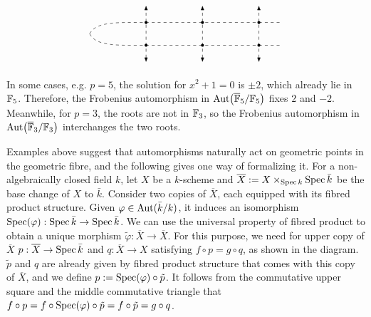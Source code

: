 \begin{example}
\[\begin{tikzpicture}[>=Latex, scale=1]
            \draw[dashed, <->] (2,0.4) -- (2,2.4);
            \fill (2,1.8) circle (1.5pt);
            \fill (2,1.0) circle (1.5pt);
        
            \draw[dashed, <->] (4,0.4) -- (4,2.4);
            \fill (4,1.8) circle (1.5pt);
            \fill (4,1.0) circle (1.5pt);
        
            \draw[dashed, <->] (6,0.4) -- (6,2.4);
            \fill (6,1.8) circle (1.5pt);
            \fill (6,1.0) circle (1.5pt);
    
            \draw[dashed]
                (0,1.4)
                .. controls (0.22,1.85) and (1.05,1.8) .. (2,1.8)
                .. controls (2.7,1.8) and (3.3,1.8) .. (4,1.8)
                .. controls (4.7,1.8) and (5.3,1.8) .. (6,1.8)
                .. controls (6.3,1.8) and (6.55,1.8) .. (6.8,1.8);
    
            \draw[dashed]
                (0,1.4)
                .. controls (0.22,0.95) and (1.05,1.0) .. (2,1.0)
                .. controls (2.7,1.0) and (3.3,1.0) .. (4,1.0)
                .. controls (4.7,1.0) and (5.3,1.0) .. (6,1.0)
                .. controls (6.3,1.0) and (6.55,1.0) .. (6.8,1.0);
        
        \end{tikzpicture}
    \]
\end{example}

In some cases, e.g. $p = 5$, the solution for $x^2 + 1 = 0$ is $\pm 2$, which already lie in $\mathbb{F}_5$. Therefore, the Frobenius automorphism in $\operatorname{Aut}\bigl(\overline{\mathbb{F}}_5/\mathbb{F}_5\bigr)$ fixes $2$ and $-2$. Meanwhile, for $p = 3$, the roots are not in $\mathbb{F}_3$, so the Frobenius automorphism in $\operatorname{Aut}\bigl(\overline{\mathbb{F}}_3/\mathbb{F}_3\bigr)$ interchanges the two roots. 

Examples above suggest that automorphisms naturally act on geometric points in the geometric fibre, and the following gives one way of formalizing it. For a non-algebraically closed field $k$, let $X$ be a $k$-scheme and $\overline{X} := X \times_{\operatorname{Spec} k} \operatorname{Spec} \bar{k}$ be the base change of $X$ to $\bar{k}$. Consider two copies of $\overline{X}$, each equipped with its fibred product structure. Given $\varphi \in \operatorname{Aut}(\bar{k}/k)$, it induces an isomorphism $\operatorname{Spec}(\varphi): \operatorname{Spec}\bar{k} \to \operatorname{Spec}\bar{k}$. We can use the universal property of fibred product to obtain a unique morphism $\widetilde{\varphi}: \overline{X} \to \overline{X}$. For this purpose, we need for upper copy of $\overline{X}$ $p: \overline{X} \to \operatorname{Spec}\bar{k}$ and $q: \overline{X} \to X$ satisfying $f \circ p = g \circ q$, as shown in the diagram. $\tilde{p}$ and $q$ are already given by fibred product structure that comes with this copy of $\overline{X}$, and we define $p := \operatorname{Spec}(\varphi) \circ \tilde{p}$. It follows from the commutative upper square and the middle commutative triangle that $f \circ p = f \circ \operatorname{Spec}(\varphi) \circ \tilde{p} = f \circ \tilde{p} = g \circ q$.

